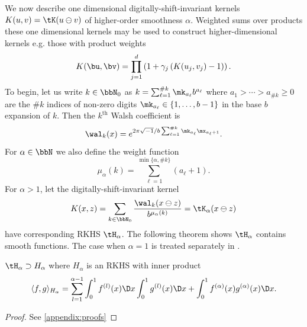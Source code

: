 \documentclass[acmsmall]{acmart}
\begin{document}
We now describe one dimensional digitally-shift-invariant kernels $K(u,v) = \tK(u \ominus v)$ of higher-order smoothness $\alpha$. Weighted sums over products these one dimensional kernels may be used to construct higher-dimensional kernels e.g. those with product weights 
$$K(\bu,\bv) = \prod_{j=1}^d \left(1+\gamma_j  \left(K(u_j,v_j)-1\right)\right).$$
To begin, let us write $k \in \bbN_0$ as $k = \sum_{\ell=1}^{\#k} \mk_{a_\ell} b^{a_\ell}$ where $a_1 > \cdots > a_{\#k} \geq 0$ are the $\#k$ indices of non-zero digits $\mk_{a_\ell} \in \{1,\dots,b-1\}$ in the base $b$ expansion of $k$. Then the $k^\mathrm{th}$ Walsh coefficient is 
$$\wal_k(x) = e^{2 \pi \sqrt{-1}/b \sum_{\ell=1}^{\#k} \mk_{a_\ell} \mx_{a_\ell+1}}.$$ 
For $\alpha \in \bbN$ we also define the weight function 
$$\mu_\alpha(k) = \sum_{\ell=1}^{\min\{\alpha,\#k\}} (a_\ell+1).$$
For $\alpha>1$, let the digitally-shift-invariant kernel 
\begin{equation}
    K(x,z) = \sum_{k \in \bbN_0} \frac{\wal_k(x \ominus z)}{b^{\mu_\alpha(k)}} = \tK_\alpha(x \ominus z)
    \label{eq:DSI_kernel}
\end{equation}
have corresponding RKHS $\tH_\alpha$. The following theorem shows $\tH_\alpha$ contains smooth functions. The case when $\alpha=1$ is treated separately in \citep{dick.multivariate_integraion_sobolev_spaces_digital_nets}.   
\begin{theorem} \label{thm:RKHS_DSI_contain}
    $\tH_\alpha \supset H_\alpha$ where $H_\alpha$ is an RKHS with inner product 
    $$\langle f,g \rangle_{H_\alpha} =\sum_{l=1}^{\alpha-1} \int_0^1 f^{(l)}(x) \D x \int_0^1 g^{(l)}(x) \D x + \int_0^1 f^{(\alpha)}(x) g^{(\alpha)}(x) \D x.$$
\end{theorem}
\begin{proof} 
    See \cref{appendix:proofs}
\end{proof}
\end{document}
